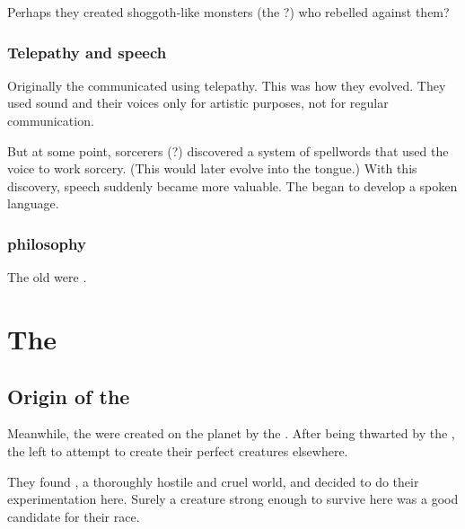Perhaps they created shoggoth-like monsters (the \bladedpeople?) who rebelled against them?





\subsubsection{Telepathy and speech}
Originally the \ophidians{} communicated using telepathy. 
This was how they evolved. 
They used sound and their voices only for artistic purposes, not for regular communication. 

But at some point, \ophidian{} sorcerers (?) discovered a system of spellwords that used the voice to work sorcery. 
(This would later evolve into the  tongue.) 
With this discovery, speech suddenly became more valuable. 
The \ophidians{} began to develop a spoken language. 





\subsubsection{\Ophidian{} philosophy}
The old \ophidians{} were . 















\section{The \FirstBanewar}
\subsection{Origin of the \banes}
Meanwhile, the  were created on the planet  by the . 
After being thwarted by the \krakens{}, the \voyagers{} left \Miith{} to attempt to create their perfect creatures elsewhere. 

They found \Erebos{}, a thoroughly hostile and cruel world, and decided to do their experimentation here. Surely a creature strong enough to survive here was a good candidate for their  race. 

